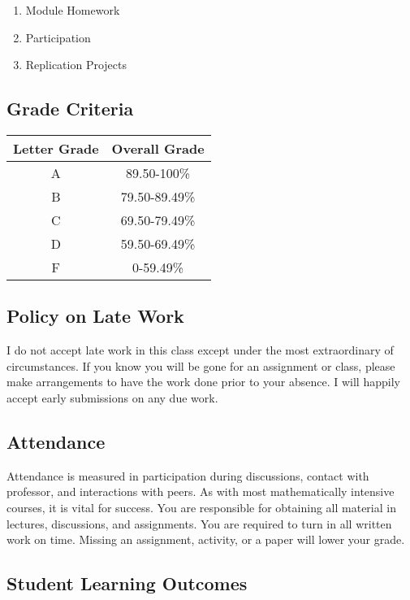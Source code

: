 \documentclass[]{tufte-handout}
\begin{document}
\begin{enumerate}
    \item Module Homework 
    \item Participation 
    \item Replication Projects
\end{enumerate}

\subsection*{Grade Criteria}
\begin{center}
    \begin{tabular}{cc}
        \textbf{Letter Grade} & \textbf{Overall Grade} \\ \hline 
        A & 89.50-100\% \\
        B & 79.50-89.49\% \\
        C & 69.50-79.49\% \\
        D & 59.50-69.49\% \\
        F & 0-59.49\% \\
    \end{tabular}
\end{center}

\subsection*{Policy on Late Work}

I do not accept late work in this class except under the most
extraordinary of circumstances. If you know you will be gone for an
assignment or class, please make arrangements to have the work done
prior to your absence. I will happily accept early submissions on any
due work.

\subsection*{Attendance}

Attendance is measured in participation during discussions, contact with
professor, and interactions with peers. As with most mathematically
intensive courses, it is vital for success. You are responsible for
obtaining all material in lectures, discussions, and assignments. You
are required to turn in all written work on time. Missing an assignment,
activity, or a paper will lower your grade.

\subsection*{Student Learning Outcomes}
\end{document}

